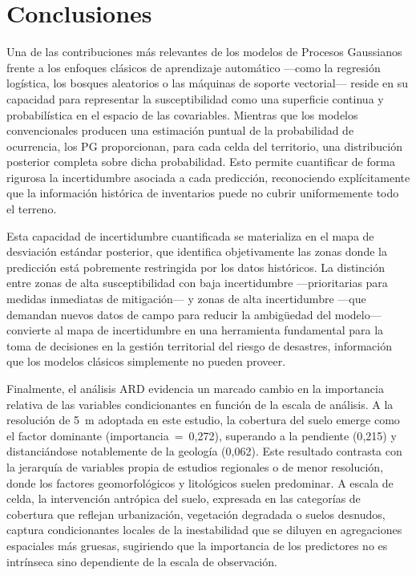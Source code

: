 \documentclass[letterpaper,11pt]{tec}
\begin{document}
{\section{Conclusiones}
\label{sec:conclusiones}

Una de las contribuciones más relevantes de los modelos de Procesos Gaussianos frente a los enfoques clásicos de aprendizaje
automático ---como la regresión logística, los bosques aleatorios o las máquinas de soporte vectorial--- reside en su capacidad
para representar la susceptibilidad como una superficie continua y probabilística en el espacio de las covariables. Mientras
que los modelos convencionales producen una estimación puntual de la probabilidad de ocurrencia, los PG proporcionan, para cada
celda del territorio, una distribución posterior completa sobre dicha probabilidad. Esto permite cuantificar de forma rigurosa la
incertidumbre asociada a cada predicción, reconociendo explícitamente que la información histórica de inventarios
puede no cubrir uniformemente todo el terreno.

Esta capacidad de incertidumbre cuantificada se materializa en el mapa de desviación estándar posterior, que identifica
objetivamente las zonas donde la predicción está pobremente restringida por los datos históricos. La distinción entre zonas de
alta susceptibilidad con baja incertidumbre ---prioritarias para medidas inmediatas de mitigación--- y zonas de alta incertidumbre
---que demandan nuevos datos de campo para reducir la ambigüedad del modelo--- convierte al mapa de incertidumbre en una herramienta
fundamental para la toma de decisiones en la gestión territorial del riesgo de desastres, información que los modelos clásicos simplemente
no pueden proveer.

Finalmente, el análisis ARD evidencia un marcado cambio en la importancia relativa de las variables condicionantes en función
de la escala de análisis. A la resolución de 5~m adoptada en este estudio, la cobertura del suelo emerge como el factor dominante
(importancia~=~0{,}272), superando a la pendiente (0{,}215) y distanciándose notablemente de la geología (0{,}062). Este resultado
contrasta con la jerarquía de variables propia de estudios regionales o de menor resolución, donde los factores geomorfológicos
y litológicos suelen predominar. A escala de celda, la intervención antrópica del suelo, expresada en las categorías de cobertura
que reflejan urbanización, vegetación degradada o suelos desnudos, captura condicionantes locales de la inestabilidad que se
diluyen en agregaciones espaciales más gruesas, sugiriendo que la importancia de los predictores no es intrínseca sino
dependiente de la escala de observación.


}
\end{document}
